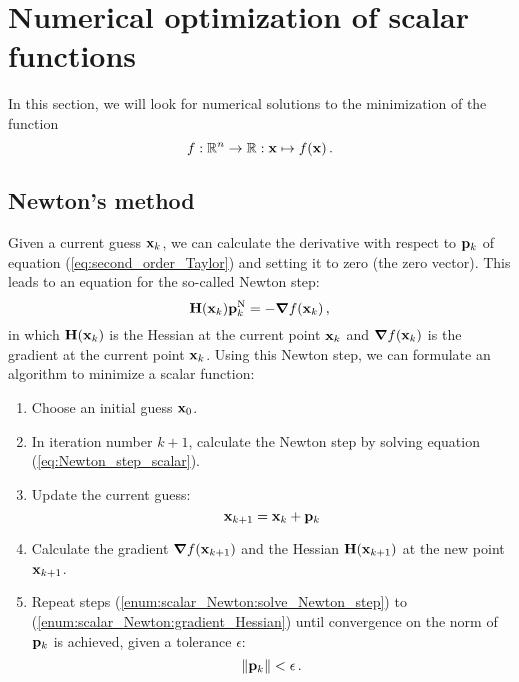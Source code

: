 \section{Numerical optimization of scalar functions}
    In this section, we will look for numerical solutions to the minimization of the function
    \begin{equation}
        f : \mathbb{R}^n \to \mathbb{R} : \vb{x} \mapsto f(\vb{x}) \thinspace .
    \end{equation}

    \subsection{Newton's method}
        Given a current guess $\vb{x}_k$, we can calculate the derivative with respect to $\vb{p}_k$ of equation (\ref{eq:second_order_Taylor}) and setting it to zero (the zero vector). This leads to an equation for the so-called Newton step:
        \begin{equation} \label{eq:Newton_step_scalar}
            \vb{H}(\vb{x}_k) \vb{p}^\text{N}_k = - \grad{f(\vb{x}_k)} \thinspace ,
        \end{equation}
        in which $\vb{H}(\vb{x}_k)$ is the Hessian at the current point $\vb{x}_k$ and $\grad{f(\vb{x}_k)}$ is the gradient at the current point $\vb{x}_k$. Using this Newton step, we can formulate an algorithm to minimize a scalar function:
        \begin{enumerate}
            \item Choose an initial guess $\vb{x}_0$.

            \item \label{enum:scalar_Newton:solve_Newton_step} In iteration number $k+1$, calculate the Newton step by solving equation (\ref{eq:Newton_step_scalar}).

            \item Update the current guess:
                \begin{equation}
                    \vb{x}_{k+1} = \vb{x}_k + \vb{p}_k
                \end{equation}

            \item \label{enum:scalar_Newton:gradient_Hessian} Calculate the gradient $\grad{f(\vb{x}_{k+1})}$ and the Hessian $\vb{H}(\vb{x}_{k+1})$ at the new point $\vb{x}_{k+1}$.

            \item Repeat steps (\ref{enum:scalar_Newton:solve_Newton_step}) to (\ref{enum:scalar_Newton:gradient_Hessian}) until convergence on the norm of $\vb{p}_k$ is achieved, given a tolerance $\epsilon$:
                \begin{equation}
                    \norm{\vb{p}_k} < \epsilon \thinspace .
                \end{equation}
        \end{enumerate}
